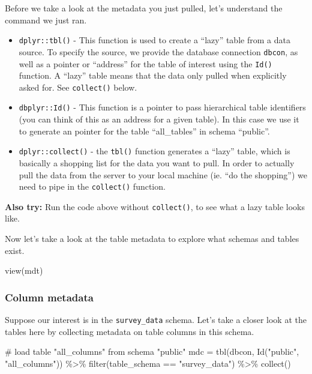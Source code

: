 \documentclass[
  letterpaper,
  DIV=11,
  numbers=noendperiod]{scrartcl}
\newenvironment{Shaded}{\begin{snugshade}}{\end{snugshade}}
\newcommand{\CommentTok}[1]{\textcolor[rgb]{0.37,0.37,0.37}{#1}}
\newcommand{\FunctionTok}[1]{\textcolor[rgb]{0.28,0.35,0.67}{#1}}
\newcommand{\NormalTok}[1]{\textcolor[rgb]{0.00,0.23,0.31}{#1}}
\newcommand{\OtherTok}[1]{\textcolor[rgb]{0.00,0.23,0.31}{#1}}
\newcommand{\SpecialCharTok}[1]{\textcolor[rgb]{0.37,0.37,0.37}{#1}}
\newcommand{\StringTok}[1]{\textcolor[rgb]{0.13,0.47,0.30}{#1}}
\providecommand{\tightlist}{%
  \setlength{\itemsep}{0pt}\setlength{\parskip}{0pt}}\usepackage{longtable,booktabs,array}
\begin{document}
Before we take a look at the metadata you just pulled, let's understand
the command we just ran.

\begin{itemize}
\tightlist
\item
  \texttt{dplyr::tbl()} - This function is used to create a ``lazy''
  table from a data source. To specify the source, we provide the
  database connection \texttt{dbcon}, as well as a pointer or
  ``address'' for the table of interest using the \texttt{Id()}
  function. A ``lazy'' table means that the data only pulled when
  explicitly asked for. See \texttt{collect()} below.
\item
  \texttt{dbplyr::Id()} - This function is a pointer to pass
  hierarchical table identifiers (you can think of this as an address
  for a given table). In this case we use it to generate an pointer for
  the table ``all\_tables'' in schema ``public''.
\item
  \texttt{dplyr::collect()} - the \texttt{tbl()} function generates a
  ``lazy'' table, which is basically a shopping list for the data you
  want to pull. In order to actually pull the data from the server to
  your local machine (ie. ``do the shopping'') we need to pipe in the
  \texttt{collect()} function.
\end{itemize}

\textbf{Also try:} Run the code above without \texttt{collect()}, to see
what a lazy table looks like.

Now let's take a look at the table metadata to explore what schemas and
tables exist.

\begin{Shaded}
\begin{Highlighting}[]
\FunctionTok{view}\NormalTok{(mdt)}
\end{Highlighting}
\end{Shaded}

\subsubsection{Column metadata}\label{column-metadata}

Suppose our interest is in the \texttt{survey\_data} schema. Let's take
a closer look at the tables here by collecting metadata on table columns
in this schema.

\begin{Shaded}
\begin{Highlighting}[]
\CommentTok{\# load table "all\_columns" from schema "public"}
\NormalTok{mdc }\OtherTok{=} \FunctionTok{tbl}\NormalTok{(dbcon, }\FunctionTok{Id}\NormalTok{(}\StringTok{"public"}\NormalTok{, }\StringTok{"all\_columns"}\NormalTok{)) }\SpecialCharTok{\%\textgreater{}\%}
  \FunctionTok{filter}\NormalTok{(table\_schema }\SpecialCharTok{==} \StringTok{"survey\_data"}\NormalTok{) }\SpecialCharTok{\%\textgreater{}\%}
  \FunctionTok{collect}\NormalTok{()}
\end{Highlighting}
\end{Shaded}
\end{document}
